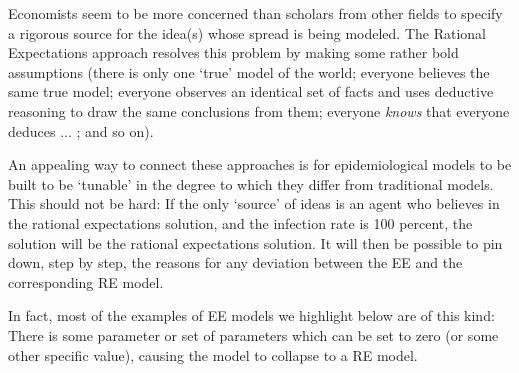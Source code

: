 Economists seem to be more concerned than scholars from other fields to specify a rigorous source for the idea(s) whose spread is being modeled.  The Rational Expectations approach resolves this problem by making some rather bold assumptions (there is only one `true' model of the world; everyone believes the same true model; everyone observes an identical set of facts and uses deductive reasoning to draw the same conclusions from them; everyone \emph{knows} that everyone deduces ... ; and so on).

An appealing way to connect these approaches is for epidemiological models to be built to be `tunable' in the degree to which they differ from traditional models.  This should not be hard:  If the only `source' of ideas is an agent who believes in the rational expectations solution, and the infection rate is 100 percent, the solution will be the rational expectations solution.  It will then be possible to pin down, step by step, the reasons for any deviation between the EE and the corresponding RE model.

In fact, most of the examples of EE models we highlight below are of this kind: There is some parameter or set of parameters which can be set to zero (or some other specific value), causing the model to collapse to a RE model.%

